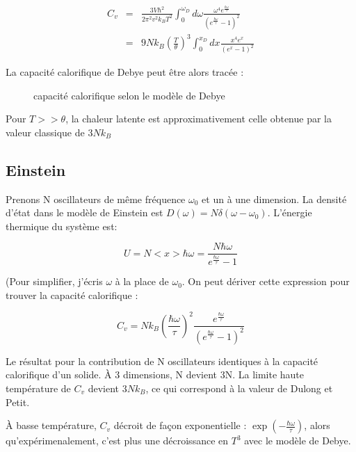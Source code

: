 \begin{eqnarray}
    C_v &=& \frac{3V\hbar^2}{2\pi^2v^2k_B T^2} \int_0^{\omega_D} d\omega \frac{\omega^4 e^{\frac{\hbar \omega}{\tau}}}{\left(
        e^{\frac{\hbar\omega}{\tau}} -1 \right)^2}\\
        & = & 9 N k_B \left( \frac{T}{\theta} \right)^3 \int_0^{x_D} dx \frac{x^4 e^x}{(e^x -1)^2}
\end{eqnarray}

La capacité calorifique de Debye peut être alors tracée :

\begin{figure}
    \TODO
    \label{debye}
    \caption{capacité calorifique selon le modèle de Debye}
\end{figure}

Pour $T>>\theta$, la chaleur latente est approximativement celle obtenue par la
valeur classique de $3Nk_B$



\subsection{Einstein}

Prenons N oscillateurs de même fréquence $\omega_0$ et un à une dimension.
La densité d'état dans le modèle de Einstein est
$D(\omega) = N \delta(\omega - \omega_0)$. L'énergie thermique du système est:

\begin{equation}
    U = N <x> \hbar \omega = \frac{N \hbar \omega}{e^{\frac{\hbar \omega}{\tau}}-1}
\end{equation}

(Pour simplifier, j'écris $\omega$ à la place de $\omega_0$. On peut dériver
cette expression pour trouver la capacité calorifique :

\begin{equation}
    C_v = N k_B \left(\frac{\hbar \omega}{\tau} \right)^2 
    \frac{e^{\frac{\hbar\omega}{\tau}}}{(e^{\frac{\hbar \omega}{\tau}} - 1)^2}
\end{equation}

Le résultat pour la contribution de N oscillateurs identiques à la capacité
calorifique d'un solide. À 3 dimensions, N devient 3N.
La limite haute température de $C_v$ devient $3Nk_B$, ce qui correspond à la
valeur de Dulong et Petit.

À basse température, $C_v$ décroit de façon exponentielle :
$\exp \left( - \frac{\hbar\omega}{\tau} \right)$, alors qu'expérimenalement, 
c'est plus une décroissance en $T^3$ avec le modèle de Debye.

